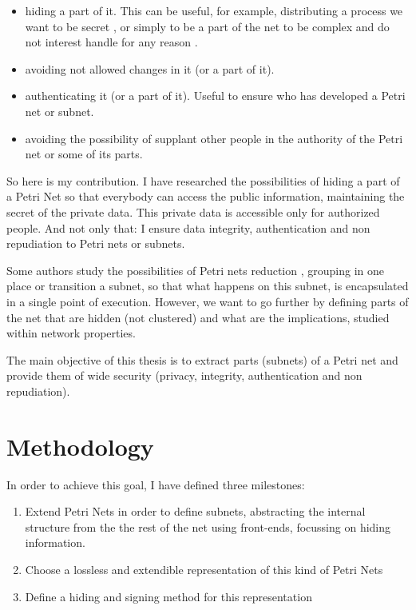 \begin{itemize}
\item 
hiding a part of it. This can be useful, for example,
distributing a process we want to be secret \citep{HID-Inigo2011MT},
or simply to be a part of the net to be complex and do not
interest handle for any reason \citep{HID-Inigo2011MT}.

\item avoiding not allowed changes in it (or a part of it).
\item authenticating it (or a part of it). Useful to ensure who has developed
a Petri net or subnet.
\item avoiding the possibility of supplant other people in the authority of
the Petri net or some of its parts.

\end{itemize}
So here is my contribution. I have researched the possibilities of hiding
a part of a Petri Net so that everybody can access the public information,
maintaining the secret of the private data. This private data is accessible only
for authorized people. And not only that: I ensure data integrity, authentication
and non repudiation to Petri nets or subnets.

Some authors study the possibilities of Petri nets reduction \citep{SN-Valette197935,SN-Suzuki198351,SN-Fahmy1990321,SN-DRUZHININVA19921922,SN-Fahmy1993127,R-Xia20111662}, grouping
in one place or transition a subnet, so that what happens
on this subnet, is encapsulated in a single point of execution. However,
we want to go further by defining parts of the net that are hidden (not clustered) and what are the implications, studied within
network properties.

The main objective of this thesis is to extract parts (subnets) of a Petri net and provide
them of wide security (privacy, integrity, authentication and non repudiation).



\section{Methodology}


In order to achieve this goal, I have defined three milestones:

\begin{enumerate}
\item
Extend Petri Nets in order to define subnets, abstracting the
internal structure from the the rest of the net using front-ends, focussing on hiding information. 
\item
Choose a lossless and extendible representation
of this kind of Petri Nets
\item
Define a hiding and signing method for this representation
\end{enumerate}



